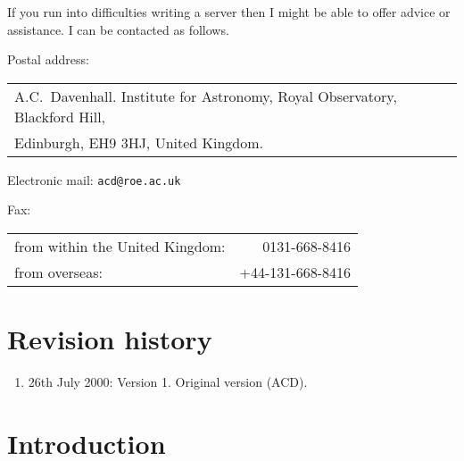 \documentclass[twoside,11pt,nolof,chapters]{starlink}
\begin{document}
If you run into difficulties writing a server then I might be able to
offer advice or assistance.  I can be contacted as follows.

Postal address: \\
\begin{tabular}{l}
A.C.~Davenhall.  Institute for Astronomy, Royal Observatory, Blackford Hill, \\
Edinburgh, EH9 3HJ, United Kingdom.  \\
\end{tabular}


Electronic mail: \texttt{acd@roe.ac.uk}


Fax: \\
\begin{tabular}{lr}
from within the United Kingdom: &    0131-668-8416 \\
from overseas:                  & +44-131-668-8416 \\
\end{tabular}

\section*{Revision history}

\begin{enumerate}

  \item 26th July 2000: Version 1. Original version (ACD).

\end{enumerate}


\vspace*{\fill}
\stardoccopyright

\cleardoublepage
\begin{latexonly}
  

  \listoffigures
  \listoftables

  
\end{latexonly}
\cleardoublepage


\section{\label{INTRO}Introduction}
\end{document}
